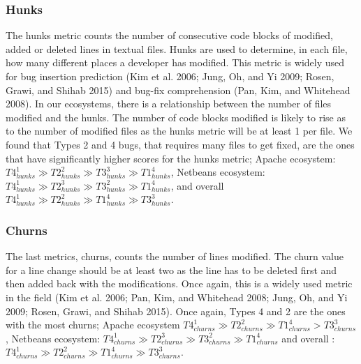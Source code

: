 \documentclass[natbib]{svjour3}
\begin{document}
\subsubsection{Hunks}\label{hunks}

The hunks metric counts the number of consecutive code blocks of
modified, added or deleted lines in textual files. Hunks are used to
determine, in each file, how many different places a developer has
modified. This metric is widely used for bug insertion prediction (Kim
et al. 2006; Jung, Oh, and Yi 2009; Rosen, Grawi, and Shihab 2015) and
bug-fix comprehension (Pan, Kim, and Whitehead 2008). In our ecosystems,
there is a relationship between the number of files modified and the
hunks. The number of code blocks modified is likely to rise as to the
number of modified files as the hunks metric will be at least 1 per
file. We found that Types 2 and 4 bugs, that requires many files to get
fixed, are the ones that have significantly higher scores for the hunks
metric; Apache ecosystem:
\(T4_{hunks}^1 \gg T2_{hunks}^2 \gg T3_{hunks}^3 \gg T1_{hunks}^4\),
Netbeans ecosystem:
\(T4_{hunks}^1 \gg T2_{hunks}^3 \gg T3_{hunks}^2 \gg T1_{hunks}^4\), and
overall
\(T4_{hunks}^1 \gg T2_{hunks}^2 \gg T1_{hunks}^4 \gg T3_{hunks}^3\).

\subsubsection{Churns}\label{churns}

The last metrics, churns, counts the number of lines modified. The churn
value for a line change should be at least two as the line has to be
deleted first and then added back with the modifications. Once again,
this is a widely used metric in the field (Kim et al. 2006; Pan, Kim,
and Whitehead 2008; Jung, Oh, and Yi 2009; Rosen, Grawi, and Shihab
2015). Once again, Types 4 and 2 are the ones with the most churns;
Apache ecosystem
\(T4_{churns}^1 \gg T2_{churns}^2 \gg T1_{churns}^4 > T3_{churns}^3\),
Netbeans ecosystem:
\(T4_{churns}^1 \gg T2_{churns}^3 \gg T3_{churns}^2 \gg T1_{churns}^4\)
and overall :
\(T4_{churns}^1 \gg T2_{churns}^2 \gg T1_{churns}^4 \gg T3_{churns}^3\).

 
\end{document}
